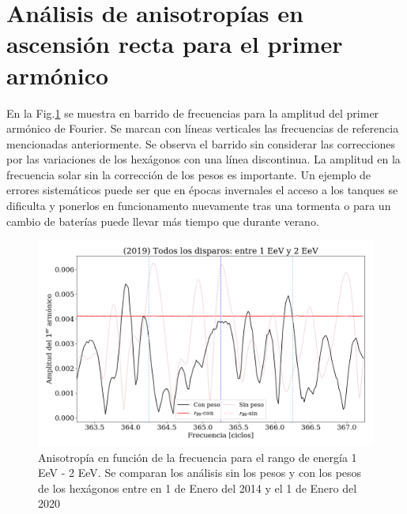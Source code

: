 


\section{Análisis de anisotropías en ascensión recta para el primer armónico}

En la Fig.\ref{anisotropia_rayleigh} se muestra en barrido de frecuencias para la amplitud del primer armónico de Fourier. Se marcan con líneas verticales las frecuencias de referencia mencionadas anteriormente. Se observa el barrido sin considerar las correcciones por las variaciones de los hexágonos con una línea discontinua. La  amplitud  en la frecuencia solar sin la corrección de los pesos es importante. Un ejemplo de errores sistemáticos puede ser que en épocas invernales el acceso a los tanques se dificulta y ponerlos en funcionamento nuevamente tras una tormenta o para un cambio de baterías puede llevar más tiempo que durante verano. 

		\begin{figure}[H]
			\centering
			\includegraphics[width=0.85\linewidth]{pesos_sin_con_1_2_EeV.png}
			\caption{Anisotropía en función de la frecuencia para el rango de energía 1  EeV - 2 EeV. Se comparan los análisis sin los pesos y con los pesos de los hexágonos entre en 1 de Enero del 2014 y el 1 de Enero del 2020}
			\label{anisotropia_rayleigh}
		\end{figure}

